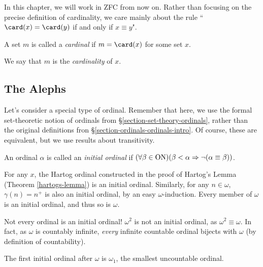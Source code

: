 \documentclass{article}
\begin{document}
\begin{note}
	In this chapter, we will work in ZFC from now on. Rather than focusing on the precise definition of cardinality, we care mainly about the rule ``$\card(x) = \card(y)$ if and only if $x \equiv y$".
\end{note}

\begin{definition}[Cardinal]
    A set $m$ is called a \textit{cardinal} if $m = \card(x)$ for some set $x$.
    
    We say that $m$ is the \textit{cardinality} of $x$.
\end{definition}


\subsection{The Alephs}

Let's consider a special type of ordinal. Remember that here, we use the formal set-theoretic notion of ordinals from \S\ref{section-set-theory-ordinals}, rather than the original definitions fron \S\ref{section-ordinals-ordinals-intro}. Of course, these are equivalent, but we use results about transitivity.

\begin{definition}
    An ordinal $\alpha$ is called an \textit{initial ordinal} if $(\forall \beta \in \mathrm{ON})(\beta < \alpha \Rightarrow \lnot(\alpha \equiv \beta))$.
\end{definition}

\begin{example}
    For any $x$, the Hartog ordinal constructed in the proof of Hartog's Lemma (Theorem \ref{hartogs-lemma}) is an initial ordinal. Similarly, for any $n \in \omega$, $\gamma(n) = n^+$ is also an initial ordinal, by an easy $\omega$-induction. Every member of $\omega$ is an initial ordinal, and thus so is $\omega$.
\end{example}

\begin{note}
	Not every ordinal is an initial ordinal! $\omega^2$ is not an initial ordinal, as $\omega^2 \equiv \omega$. In fact, as $\omega$ is countably infinite, \textit{every} infinite countable ordinal bijects with $\omega$ (by definition of countability).
\end{note}

\begin{corollary}
     The first initial ordinal after $\omega$ is $\omega_1$, the smallest uncountable ordinal.
\end{corollary}
\end{document}
